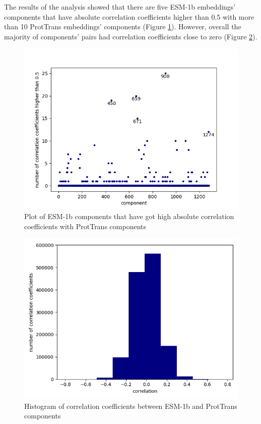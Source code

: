 \documentclass[12pt]{article}
\begin{document}
	The results of the analysis showed that there are five ESM-1b
	embeddings' components that have absolute correlation coefficients 
	higher than 0.5 with more than 10 ProtTrans embeddings' components  
	(Figure \ref{figure:highCorrelationComponents}). However, overall the 
	majority of components' pairs had correlation coefficients close to zero 
	(Figure \ref{figure:correlationComponentsHisto}).

	\begin{figure}[h!]
		\centering
		\includegraphics[scale=0.85]{validation_small_set_2_joined_correlation_high_corr.png}

		\caption{Plot of ESM-1b components that have got high absolute correlation 
		coefficients with ProtTrans components}
		\label{figure:highCorrelationComponents}
	\end{figure}

	\newpage

	\begin{figure}[h!]
		\centering
		\includegraphics[scale=0.85]{validation_small_set_2_joined_correlation_hist.png}

		\caption{Histogram of correlation coefficients between ESM-1b 
		and ProtTrans components}
		\label{figure:correlationComponentsHisto}
	\end{figure}
\end{document}
